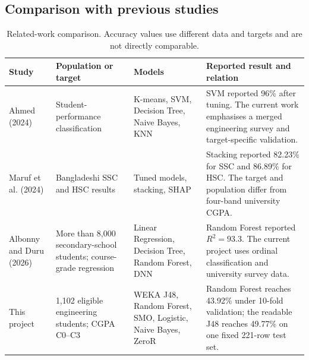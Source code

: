 \subsection{Comparison with previous studies}
\begin{table}[H]\centering\scriptsize
\caption{Related-work comparison. Accuracy values use different data and targets and are not directly comparable.}\label{tab:related}
\begin{tabularx}{\textwidth}{p{}p{}p{}Y}\toprule
Study&Population or target&Models&Reported result and relation\\\midrule
Ahmed (2024) \cite{ahmed2024}&Student-performance classification&K-means, SVM, Decision Tree, Naive Bayes, KNN&SVM reported 96\% after tuning. The current work emphasises a merged engineering survey and target-specific validation.\\
Maruf et al. (2024) \cite{maruf2024}&Bangladeshi SSC and HSC results&Tuned models, stacking, SHAP&Stacking reported 82.23\% for SSC and 86.89\% for HSC. The target and population differ from four-band university CGPA.\\
Albonny and Duru (2026) \cite{albonny2026}&More than 8,000 secondary-school students; course-grade regression&Linear Regression, Decision Tree, Random Forest, DNN&Random Forest reported $R^2=93.3$. The current project uses ordinal classification and university survey data.\\
This project&1,102 eligible engineering students; CGPA C0--C3&WEKA J48, Random Forest, SMO, Logistic, Naive Bayes, ZeroR&Random Forest reaches 43.92\% under 10-fold validation; the readable J48 reaches 49.77\% on one fixed 221-row test set.\\\bottomrule
\end{tabularx}
\end{table}
